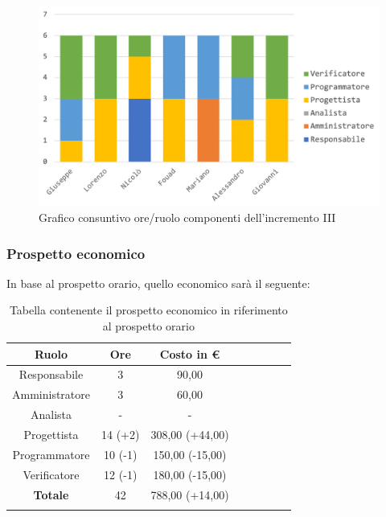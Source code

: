 			\begin{figure}[H]
				\centering
				\includegraphics[width=0.8\linewidth]{images/consuntivo/ConsIncr3-1.png}
				\caption{Grafico consuntivo ore/ruolo componenti dell'incremento III}
				\label{fig:consuntivo grafico suddivione ruoli incremento III}
			\end{figure}
			\pagebreak
			
		\subsubsection{Prospetto economico}
			In base al prospetto orario, quello economico sarà il seguente: 
			
			\begin{longtable}{|c|c|c|c|c|c|c|c}
				\hline
				\rowcolor{lighter-grayer}
				\textbf{Ruolo} & \textbf{Ore} & \textbf{Costo in €} \\
				\hline
				\endfirsthead
				\hline
			Responsabile 	    & 3 & 90,00 \\
			\hline 
			\hline
			Amministratore	  & 3 & 60,00\\
			\hline
			\hline
			Analista 				& - & -\\
			\hline
			\hline
			Progettista 		  & 14 (+2) & 308,00 (+44,00)\\
			\hline
			\hline
			Programmatore 	 & 10 (-1) & 150,00 (-15,00) \\
			\hline
			\hline
			Verificatore 		  & 12 (-1) & 180,00 (-15,00)\\
			\hline
			\textbf{Totale} 	& 42 & 788,00 (+14,00)\\
			\hline 
				
				\caption{Tabella contenente il prospetto economico in riferimento al prospetto orario}
			\end{longtable}
			
